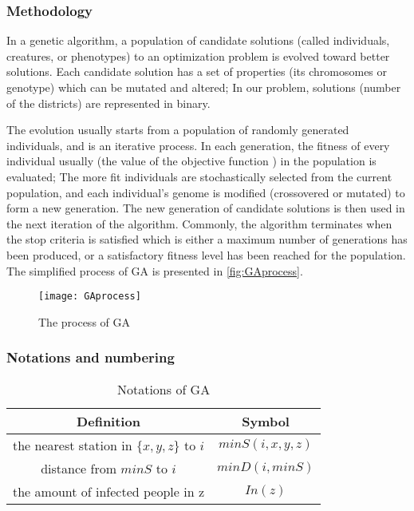 \subsubsection{Methodology}
In a genetic algorithm, a population of candidate solutions (called individuals, creatures, or phenotypes) to an optimization problem is evolved toward better solutions. Each candidate solution has a set of properties (its chromosomes or genotype) which can be mutated and altered; In our problem, solutions (number of the districts) are represented in binary.

The evolution usually starts from a population of randomly generated individuals, and is an iterative process. In each generation, the fitness of every individual usually (the value of the objective function ) in the population is evaluated; The more fit individuals are stochastically selected from the current population, and each individual's genome is modified (crossovered or mutated) to form a new generation. The new generation of candidate solutions is then used in the next iteration of the algorithm. Commonly, the algorithm terminates when the stop criteria is satisfied which is either a maximum number of generations has been produced, or a satisfactory fitness level has been reached for the population. The simplified process of GA is presented in \autoref{fig:GAprocess}.

\begin{figure}[ht]
\small
\centering
\texttt{[image: GAprocess]}
\caption{The process of GA}
\label{fig:GAprocess}
\end{figure}

\subsubsection{Notations and numbering}

\begin{table}[h!]
\caption{Notations of GA} 
\medskip
\centering
\begin{tabular}{c c}
\hline
Definition & Symbol \\ [0.5ex]
\hline
the nearest station in $\{x,y,z\}$ to $i$ & $minS(i,x,y,z)$ \\
distance from $minS$ to $i$ & $minD(i,minS)$ \\
the amount of infected people in z & $In(z)$ \\

\hline
\end{tabular}
\label{t:notofGA}
\end{table}

